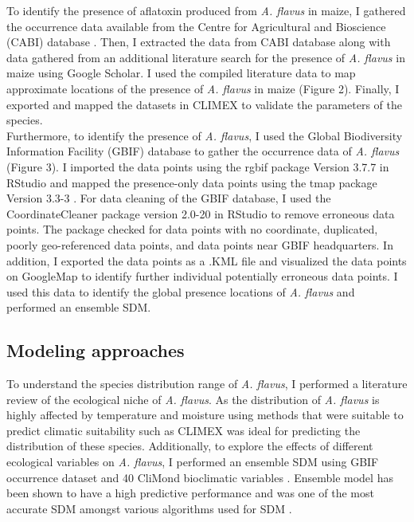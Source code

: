 To identify the presence of aflatoxin produced from \textit{A. flavus} in maize, I gathered the  occurrence data available from the Centre for Agricultural and Bioscience (CABI) database \citep{10.1079/cabicompendium.7432}. Then, I extracted the data from CABI database along with data gathered from an additional literature search for the presence of \textit{A. flavus} in maize using Google Scholar. I used the compiled literature data to map approximate locations of the presence of \textit{A. flavus} in maize (Figure 2). Finally, I exported and mapped the datasets in CLIMEX to validate the parameters of the species.
\pagebreak \\
Furthermore, to identify the presence of \textit{A. flavus}, I used the Global Biodiversity Information Facility (GBIF) database to gather the  occurrence data of \textit{A. flavus} (Figure 3). I imported the data points using the rgbif package Version 3.7.7 \citep{rgbif} in RStudio and mapped the presence-only data points using the tmap package Version 3.3-3 \citep{tmap}. For data cleaning of the GBIF database, I used the CoordinateCleaner package version 2.0-20 \citep{coordclean} in RStudio to remove erroneous data points. The package checked for data points with no coordinate, duplicated, poorly geo-referenced data points, and data points near GBIF headquarters. In addition, I exported the data points as a .KML file and visualized the data points on GoogleMap to identify further individual potentially erroneous data points. I used this data to identify the global presence locations of \textit{A. flavus} and performed an ensemble SDM.
\subsection{Modeling approaches}
To understand the species distribution range of \textit{A. flavus}, I performed a literature review of the ecological niche of \textit{A. flavus}. As the distribution of \textit{A. flavus} is highly affected by temperature \citep{arrus2005aflatoxin} and moisture  \citep{holmquist1983influence} \citep{diener1987epidemiology} \citep{jaime2010crop}  using methods that were suitable to predict climatic suitability such as CLIMEX was ideal for predicting the distribution of these species. Additionally, to explore the effects of different ecological variables on \textit{A. flavus}, I performed an ensemble SDM using GBIF  occurrence dataset and 40 CliMond bioclimatic variables \citep{kriticos2012climond}. Ensemble model has been shown to have a high predictive performance and was one of the most accurate SDM amongst various algorithms used for SDM \citep{valavi2022predictive}. 

